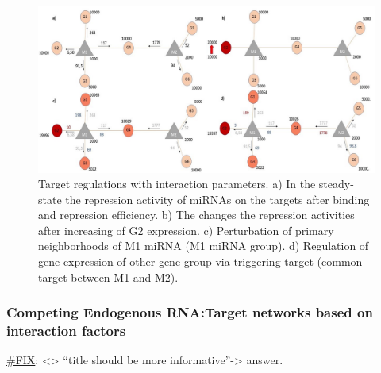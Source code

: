 \documentclass[a4,center,fleqn]{NAR}
\begin{document}
\begin{figure}
\hypertarget{fig3}{%
\centering
\includegraphics{Fig3.jpg}
\caption{Target regulations with interaction parameters. a) In the
steady-state the repression activity of miRNAs on the targets after
binding and repression efficiency. b) The changes the repression
activities after increasing of G2 expression. c) Perturbation of primary
neighborhoods of M1 miRNA (M1 miRNA group). d) Regulation of gene
expression of other gene group via triggering target (common target
between M1 and M2).}\label{fig3}
}
\end{figure}

\hypertarget{competing-endogenous-rnatarget-networks-based-on-interaction-factors}{%
\subsubsection{Competing Endogenous RNA:Target networks based on
interaction
factors}\label{competing-endogenous-rnatarget-networks-based-on-interaction-factors}}

\href{}{\#FIX}: \textless{}\textgreater{} ``title should be more
informative''-\textgreater{} answer.
\end{document}
